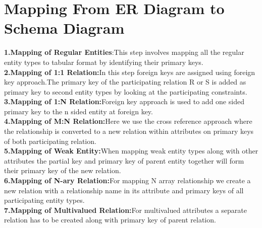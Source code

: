 \documentclass[12pt,a4paper]{report}
\begin{document}
\newpage\section{Mapping From ER Diagram to Schema Diagram}
\textbf{1.Mapping of Regular Entities}:This step involves mapping all the regular entity types to tabular format by identifying their primary keys.\\
\textbf{2.Mapping of 1:1 Relation:}In this step foreign keys are assigned using foreign key approach.The primary key of the participating relation R or S is added as primary key to second entity types by looking at the participating constraints.\\
\textbf{3.Mapping of 1:N Relation:}Foreign key approach is used to add one sided primary key to the n sided entity at foreign key.\\
\textbf{4.Mapping of M:N Relation:}Here we use the cross reference approach where the relationship is converted to a new relation within attributes on primary keys of both participating relation.\\
\textbf{5.Mapping of Weak Entity:}When mapping weak entity types along with other attributes the partial key and primary key of parent entity together will form their primary key of the new relation.\\
\textbf{6.Mapping of N-ary Relation:}For mapping N array relationship we create a new relation with a relationship name in its attribute and primary keys of all participating entity types.\\
\textbf{7.Mapping of Multivalued Relation:}For multivalued attributes a separate relation has to be created along with primary key of parent relation.\\
\end{document}
